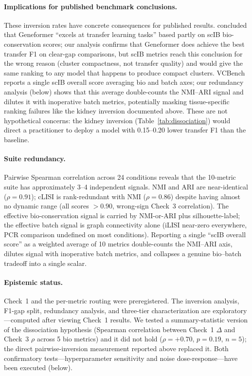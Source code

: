 \documentclass[10pt,letterpaper]{article}
\begin{document}
\paragraph{Implications for published benchmark conclusions.} These inversion rates have concrete consequences for published results. \citet{wu2025scfm} concluded that Geneformer ``excels at transfer learning tasks'' based partly on scIB bio-conservation scores; our analysis confirms that Geneformer does achieve the best transfer F1 on clear-gap comparisons, but scIB metrics reach this conclusion for the wrong reason (cluster compactness, not transfer quality) and would give the same ranking to any model that happens to produce compact clusters. VCBench \citep{vcbench2026} reports a single scIB overall score averaging bio and batch axes; our redundancy analysis (below) shows that this average double-counts the NMI--ARI signal and dilutes it with inoperative batch metrics, potentially masking tissue-specific ranking failures like the kidney inversion documented above. These are not hypothetical concerns: the kidney inversion (Table~\ref{tab:dissociation}) would direct a practitioner to deploy a model with 0.15--0.20 lower transfer F1 than the baseline.

\paragraph{Suite redundancy.} Pairwise Spearman correlation across 24 conditions reveals that the 10-metric suite has approximately 3--4 independent signals. NMI and ARI are near-identical ($\rho = 0.91$); cLISI is rank-redundant with NMI ($\rho = 0.86$) despite having almost no dynamic range (all scores $> 0.90$, wrong-sign Check~3 correlation). The effective bio-conservation signal is carried by NMI-or-ARI plus silhouette-label; the effective batch signal is graph connectivity alone (iLISI near-zero everywhere, PCR comparison undefined on most conditions). Reporting a single ``scIB overall score'' as a weighted average of 10 metrics double-counts the NMI--ARI axis, dilutes signal with inoperative batch metrics, and collapses a genuine bio--batch tradeoff into a single scalar.

\paragraph{Epistemic status.} Check~1 and the per-metric routing were preregistered. The inversion analysis, F1-gap split, redundancy analysis, and three-tier characterization are exploratory---computed after viewing Check~1 results. We tested a summary-statistic version of the dissociation hypothesis (Spearman correlation between Check~1 $\Delta$ and Check~3 $\rho$ across 5 bio metrics) and it did not hold ($\rho = +0.70$, $p = 0.19$, $n = 5$); the direct pairwise-inversion measurement reported above replaced it. Both confirmatory tests---hyperparameter sensitivity and noise dose-response---have been executed (below).
\end{document}
